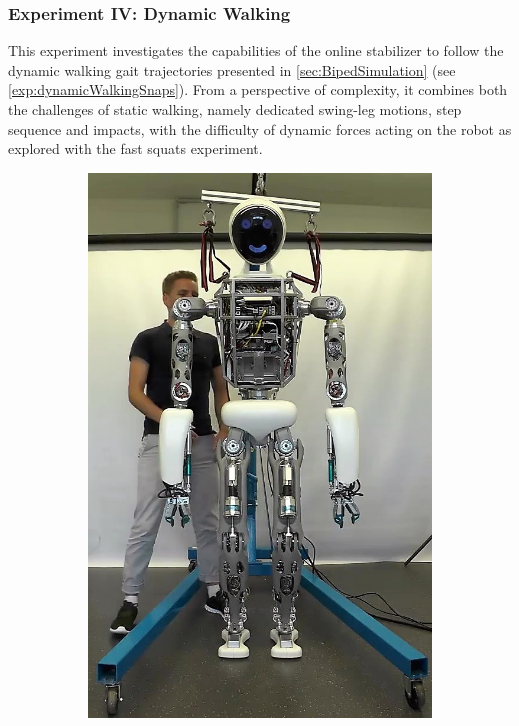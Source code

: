 \subsubsection{Experiment IV: Dynamic Walking}
This experiment investigates the capabilities of the online stabilizer to follow the dynamic walking gait trajectories presented in \cref{sec:BipedSimulation} (see \cref{exp:dynamicWalkingSnaps}). From a perspective of complexity, it combines both the challenges of static walking, namely dedicated swing-leg motions, step sequence and impacts, with the difficulty of dynamic forces acting on the robot as explored with the fast squats experiment.
\begin{figure}[h!]
\begin{subfigure}{.2\textwidth}
	\includegraphics[width=.95\linewidth]{experiments/walkDynamic/snaps/1}

\end{subfigure}
\end{figure}
